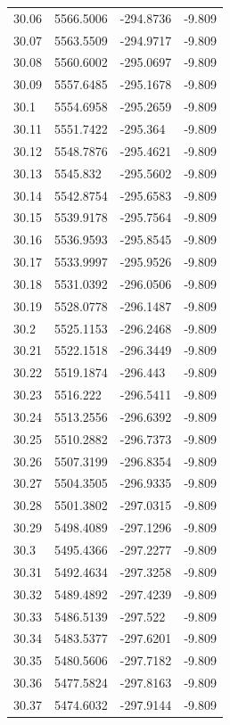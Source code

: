 \begin{table}[H]
\begin{tabular}{llll}
30.06 & 5566.5006 & -294.8736 & -9.809 \\
30.07 & 5563.5509 & -294.9717 & -9.809 \\
30.08 & 5560.6002 & -295.0697 & -9.809 \\
30.09 & 5557.6485 & -295.1678 & -9.809 \\
30.1 & 5554.6958 & -295.2659 & -9.809 \\
30.11 & 5551.7422 & -295.364 & -9.809 \\
30.12 & 5548.7876 & -295.4621 & -9.809 \\
30.13 & 5545.832 & -295.5602 & -9.809 \\
30.14 & 5542.8754 & -295.6583 & -9.809 \\
30.15 & 5539.9178 & -295.7564 & -9.809 \\
30.16 & 5536.9593 & -295.8545 & -9.809 \\
30.17 & 5533.9997 & -295.9526 & -9.809 \\
30.18 & 5531.0392 & -296.0506 & -9.809 \\
30.19 & 5528.0778 & -296.1487 & -9.809 \\
30.2 & 5525.1153 & -296.2468 & -9.809 \\
30.21 & 5522.1518 & -296.3449 & -9.809 \\
30.22 & 5519.1874 & -296.443 & -9.809 \\
30.23 & 5516.222 & -296.5411 & -9.809 \\
30.24 & 5513.2556 & -296.6392 & -9.809 \\
30.25 & 5510.2882 & -296.7373 & -9.809 \\
30.26 & 5507.3199 & -296.8354 & -9.809 \\
30.27 & 5504.3505 & -296.9335 & -9.809 \\
30.28 & 5501.3802 & -297.0315 & -9.809 \\
30.29 & 5498.4089 & -297.1296 & -9.809 \\
30.3 & 5495.4366 & -297.2277 & -9.809 \\
30.31 & 5492.4634 & -297.3258 & -9.809 \\
30.32 & 5489.4892 & -297.4239 & -9.809 \\
30.33 & 5486.5139 & -297.522 & -9.809 \\
30.34 & 5483.5377 & -297.6201 & -9.809 \\
30.35 & 5480.5606 & -297.7182 & -9.809 \\
30.36 & 5477.5824 & -297.8163 & -9.809 \\
30.37 & 5474.6032 & -297.9144 & -9.809 \\

\end{tabular}
\end{table}
